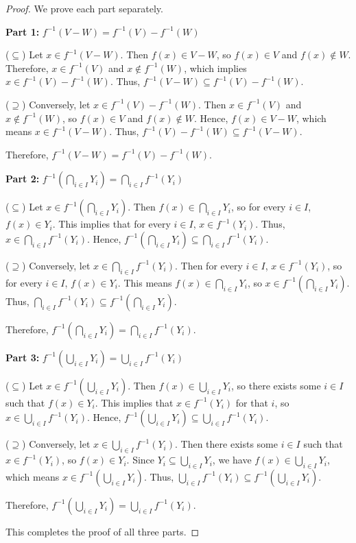 \documentclass[../main.tex]{subfiles}
\begin{document}
\begin{proof}
We prove each part separately.

\noindent\textbf{Part 1:} $f^{-1}(V-W)=f^{-1}(V)-f^{-1}(W)$

($\subseteq$) Let $x \in f^{-1}(V-W)$. Then $f(x) \in V-W$, so $f(x) \in V$ and $f(x) \notin W$. 
Therefore, $x \in f^{-1}(V)$ and $x \notin f^{-1}(W)$, which implies $x \in f^{-1}(V)-f^{-1}(W)$. 
Thus, $f^{-1}(V-W) \subseteq f^{-1}(V)-f^{-1}(W)$.

($\supseteq$) Conversely, let $x \in f^{-1}(V)-f^{-1}(W)$. Then $x \in f^{-1}(V)$ and $x \notin f^{-1}(W)$, 
so $f(x) \in V$ and $f(x) \notin W$. Hence, $f(x) \in V-W$, which means $x \in f^{-1}(V-W)$. 
Thus, $f^{-1}(V)-f^{-1}(W) \subseteq f^{-1}(V-W)$.

Therefore, $f^{-1}(V-W) = f^{-1}(V)-f^{-1}(W)$.

\medskip

\noindent\textbf{Part 2:} $f^{-1}\left(\bigcap_{i\in I}Y_i\right) = \bigcap_{i\in I}f^{-1}(Y_i)$

($\subseteq$) Let $x \in f^{-1}\left(\bigcap_{i\in I}Y_i\right)$. Then $f(x) \in \bigcap_{i\in I}Y_i$, 
so for every $i \in I$, $f(x) \in Y_i$. This implies that for every $i \in I$, $x \in f^{-1}(Y_i)$. 
Thus, $x \in \bigcap_{i\in I}f^{-1}(Y_i)$. Hence, $f^{-1}\left(\bigcap_{i\in I}Y_i\right) \subseteq \bigcap_{i\in I}f^{-1}(Y_i)$.

($\supseteq$) Conversely, let $x \in \bigcap_{i\in I}f^{-1}(Y_i)$. Then for every $i \in I$, $x \in f^{-1}(Y_i)$, 
so for every $i \in I$, $f(x) \in Y_i$. This means $f(x) \in \bigcap_{i\in I}Y_i$, 
so $x \in f^{-1}\left(\bigcap_{i\in I}Y_i\right)$. 
Thus, $\bigcap_{i\in I}f^{-1}(Y_i) \subseteq f^{-1}\left(\bigcap_{i\in I}Y_i\right)$.

Therefore, $f^{-1}\left(\bigcap_{i\in I}Y_i\right) = \bigcap_{i\in I}f^{-1}(Y_i)$.

\medskip

\noindent\textbf{Part 3:} $f^{-1}\left(\bigcup_{i\in I}Y_i\right) = \bigcup_{i\in I}f^{-1}(Y_i)$

($\subseteq$) Let $x \in f^{-1}\left(\bigcup_{i\in I}Y_i\right)$. Then $f(x) \in \bigcup_{i\in I}Y_i$, 
so there exists some $i \in I$ such that $f(x) \in Y_i$. This implies that $x \in f^{-1}(Y_i)$ for that $i$, 
so $x \in \bigcup_{i\in I}f^{-1}(Y_i)$. 
Hence, $f^{-1}\left(\bigcup_{i\in I}Y_i\right) \subseteq \bigcup_{i\in I}f^{-1}(Y_i)$.

($\supseteq$) Conversely, let $x \in \bigcup_{i\in I}f^{-1}(Y_i)$. Then there exists some $i \in I$ such that $x \in f^{-1}(Y_i)$, 
so $f(x) \in Y_i$. Since $Y_i \subseteq \bigcup_{i\in I}Y_i$, we have $f(x) \in \bigcup_{i\in I}Y_i$, 
which means $x \in f^{-1}\left(\bigcup_{i\in I}Y_i\right)$. 
Thus, $\bigcup_{i\in I}f^{-1}(Y_i) \subseteq f^{-1}\left(\bigcup_{i\in I}Y_i\right)$.

Therefore, $f^{-1}\left(\bigcup_{i\in I}Y_i\right) = \bigcup_{i\in I}f^{-1}(Y_i)$.

This completes the proof of all three parts.
\end{proof}
\end{document}
